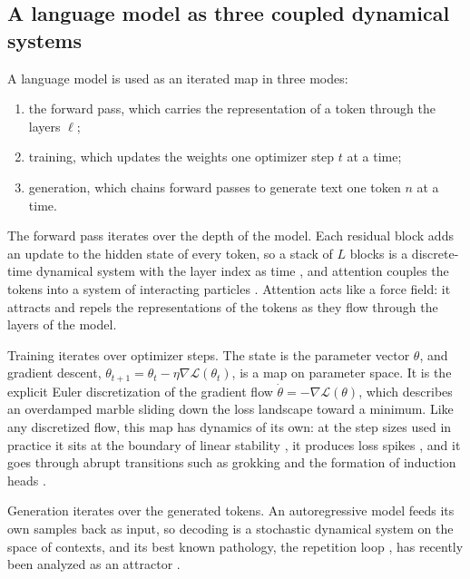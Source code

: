\subsection{A language model as three coupled dynamical systems}
\label{sec:threemodes}

A language model is used as an iterated map in three modes:
\begin{enumerate}[leftmargin=*,itemsep=1pt,topsep=2pt]
\item the forward pass, which carries the representation of a token through the layers $\ell$;
\item training, which updates the weights one optimizer step $t$ at a time;
\item generation, which chains forward passes to generate text one token $n$ at a time.
\end{enumerate}

The forward pass iterates over the depth of the model. Each residual block adds an update to the hidden state of every token, so a stack of $L$ blocks is a discrete-time dynamical system with the layer index as time \citep{e2017proposal,haber2017stable,lu2017finite,chen2018neural}, and attention couples the tokens into a system of interacting particles \citep{lu2019improving,sander2021sinkformers,geshkovski2023mathematical}. Attention acts like a force field: it attracts and repels the representations of the tokens as they flow through the layers of the model.

Training iterates over optimizer steps. The state is the parameter vector $\theta$, and gradient descent, $\theta_{t+1}=\theta_t-\eta\nabla\mathcal L(\theta_t)$, is a map on parameter space. It is the explicit Euler discretization of the gradient flow $\dot\theta=-\nabla\mathcal L(\theta)$, which describes an overdamped marble sliding down the loss landscape toward a minimum. Like any discretized flow, this map has dynamics of its own: at the step sizes used in practice it sits at the boundary of linear stability \citep{cohen2021gradient}, it produces loss spikes \citep{chowdhery2022palm,wortsman2023smallscale}, and it goes through abrupt transitions such as grokking \citep{power2022grokking} and the formation of induction heads \citep{olsson2022incontext}.

Generation iterates over the generated tokens. An autoregressive model feeds its own samples back as input, so decoding is a stochastic dynamical system on the space of contexts, and its best known pathology, the repetition loop \citep{holtzman2019curious,xu2022learning}, has recently been analyzed as an attractor \citep{wang2025unveiling,jones2026chaos}.

